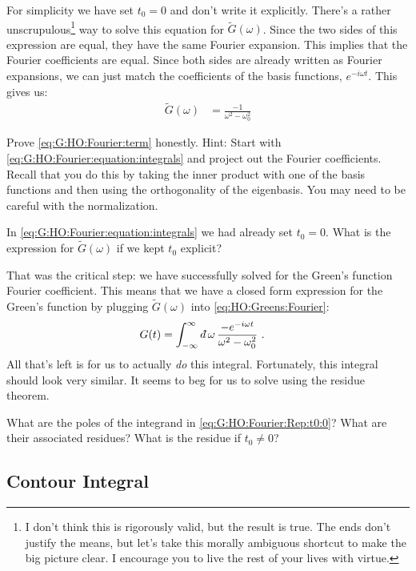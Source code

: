 For simplicity we have set $t_0=0$ and don't write it explicitly. There's a rather unscrupulous\footnote{I don't think this is rigorously valid, but the result is true. The ends don't justify the means, but let's take this morally ambiguous shortcut to make the big picture clear. I encourage you to live the rest of your lives with virtue.} way to solve this equation for $\tilde G(\omega)$. Since the two sides of this expression are equal, they have the same Fourier expansion. This implies that the Fourier coefficients are equal. Since both sides are already written as Fourier expansions, we can just match the coefficients of the basis functions, $e^{-i\omega t}$. This gives us:
\begin{align}
	\tilde G(\omega) &= \frac{-1}{\omega^2-\omega_0^2}
	\label{eq:G:HO:Fourier:term}
\end{align}
\begin{exercise}
Prove \eqref{eq:G:HO:Fourier:term} honestly. {Hint}: Start with \eqref{eq:G:HO:Fourier:equation:integrals} and project out the Fourier coefficients. Recall that you do this by taking the inner product with one of the basis functions and then using the orthogonality of the eigenbasis. You may need to be careful with the normalization.
\end{exercise}
\begin{exercise}
In \eqref{eq:G:HO:Fourier:equation:integrals} we had already set $t_0 = 0$. What is the expression for $\tilde G(\omega)$ if we kept $t_0$ explicit?
\end{exercise}
That was the critical step: we have successfully solved for the Green's function Fourier coefficient. This means that we have a closed form expression for the Green's function by plugging $\tilde G(\omega)$ into \eqref{eq:HO:Greens:Fourier}:
\begin{align}
	G(t) &=  \int_{-\infty}^\infty \dbar \omega
	\, 
	\frac{-e^{-i\omega t}}{\omega^2-\omega_0^2} \ .
	\label{eq:G:HO:Fourier:Rep:t0:0}
\end{align}
All that's left is for us to actually \emph{do} this integral. Fortunately, this integral should look very similar. It seems to beg for us to solve using the residue theorem. 
\begin{exercise}
What are the poles of the integrand in \eqref{eq:G:HO:Fourier:Rep:t0:0}? What are their associated residues? What is the residue if $t_0\neq 0$?
\end{exercise}

\subsection{Contour Integral}

